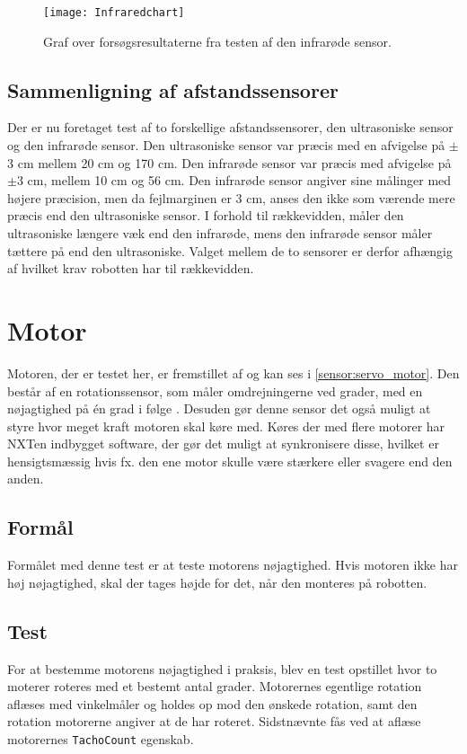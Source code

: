 \begin{figure}[h]
\texttt{[image: Infraredchart]}
\caption{Graf over forsøgsresultaterne fra testen af den infrarøde sensor.}
\label{sensor:infrared_chart}
\end{figure}

\subsection{Sammenligning af afstandssensorer}\label{sensor:sammenligningIRvsSonar}

Der er nu foretaget test af to forskellige afstandssensorer, den ultrasoniske sensor og den infrarøde sensor. 
Den ultrasoniske sensor var præcis med en afvigelse på $\pm$3 cm mellem 20 cm og 170 cm.
Den infrarøde sensor var præcis med afvigelse på $\pm$3 cm, mellem 10 cm og 56 cm.
Den infrarøde sensor angiver sine målinger med højere præcision, men da fejlmarginen er 3 cm, anses den ikke som værende mere præcis end den ultrasoniske sensor.
I forhold til rækkevidden, måler den ultrasoniske længere væk end den infrarøde, mens den infrarøde sensor måler tættere på end den ultrasoniske.
Valget mellem de to sensorer er derfor afhængig af hvilket krav robotten har til rækkevidden.

\section{Motor}\label{sensorer:motorer}
Motoren, der er testet her, er fremstillet af \lego og kan ses i \cref{sensor:servo_motor}.
Den består af en rotationssensor, som måler omdrejningerne ved grader, med en nøjagtighed på \'en grad i følge \lego. 
Desuden gør denne sensor det også muligt at styre hvor meget kraft motoren skal køre med.
Køres der med flere motorer har NXTen indbygget software, der gør det muligt at synkronisere disse, hvilket er hensigtsmæssig hvis fx. den ene motor skulle være stærkere eller svagere end den anden.\cite{tikNXT}

\subsection{Formål}
Formålet med denne test er at teste motorens nøjagtighed.
Hvis motoren ikke har høj nøjagtighed, skal der tages højde for det, når den monteres på robotten.

\subsection{Test}
For at bestemme motorens nøjagtighed i praksis, blev en test opstillet hvor to moterer roteres med et bestemt antal grader.
Motorernes egentlige rotation aflæses med vinkelmåler og holdes op mod den ønskede rotation, samt den rotation motorerne angiver at de har roteret.
Sidstnævnte fås ved at aflæse motorernes \lstinline[style=csharp]!TachoCount! egenskab.

